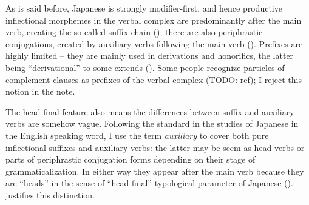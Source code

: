 \documentclass[UTF8, a4paper, oneside, scheme=plain]{ctexrep}
\newcommand*{\term}[1]{\emph{#1}}
\begin{document}
As is said before, Japanese is strongly modifier-first,
and hence productive inflectional morphemes in the verbal complex 
are predominantly after the main verb,
creating the so-called suffix chain ();
there are also periphrastic conjugations, 
created by auxiliary verbs following the main verb ().
Prefixes are highly limited -- they are mainly used in derivations and honorifics,
the latter being ``derivational'' to some extends ().
Some people recognize particles of complement clauses as prefixes of the verbal complex (TODO: ref);
I reject this notion in the note.

The head-final feature also means the differences between 
suffix and auxiliary verbs are somehow vague.
Following the standard in the studies of Japanese in the English speaking word, 
I use the term \term{auxiliary} to cover both pure inflectional suffixes and auxiliary verbs:
the latter may be seem as head verbs or parts of periphrastic conjugation forms
depending on their stage of grammaticalization.
In either way they appear after the main verb because they are ``heads'' 
in the sense of ``head-final'' typological parameter of Japanese ().
 justifies this distinction.
\end{document}
